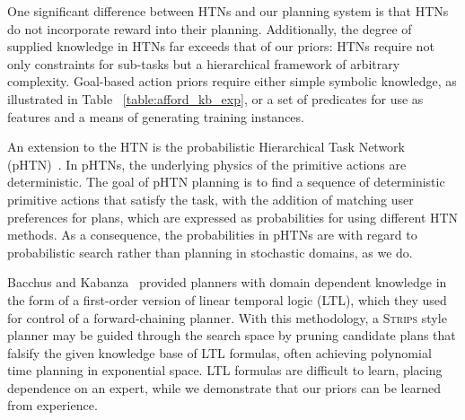 \documentclass[letterpaper]{article}
\begin{document}
One significant difference between HTNs and our planning system is that HTNs do
not incorporate reward into their planning. Additionally, the degree of supplied knowledge in HTNs
far exceeds that of our priors: HTNs require not only constraints for
sub-tasks but a hierarchical framework of arbitrary
complexity. Goal-based action priors require either simple symbolic knowledge, as
illustrated in Table ~\ref{table:afford_kb_exp}, or a set of
predicates for use as features and a means of generating training instances.


An extension to the HTN is the probabilistic Hierarchical Task Network (pHTN)~\cite{li2010learning}. In pHTNs, the underlying physics of the primitive actions are deterministic. The goal of pHTN planning is to find a sequence of deterministic primitive actions that satisfy the task, with the addition of matching user preferences for plans, which are expressed as probabilities for using different HTN methods. As a consequence, the probabilities in pHTNs are with regard to probabilistic search rather than planning in stochastic domains, as we do.


Bacchus and
Kabanza~\cite{Bacchus95usingtemporal,Bacchus99usingtemporal} provided
planners with domain dependent knowledge in the form of a first-order
version of linear temporal logic (LTL), which they used for control of
a forward-chaining planner. With this methodology, a \textsc{Strips}
style planner may be guided through the search space by pruning
candidate plans that falsify the given knowledge base of LTL formulas,
often achieving polynomial time planning in exponential space.  LTL
formulas are difficult to learn, placing dependence on an expert,
while we demonstrate that our priors can be learned
from experience.

\end{document}
